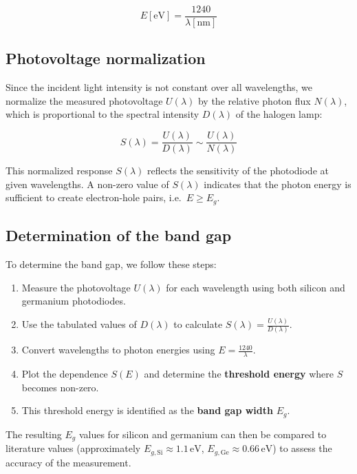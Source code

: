 \documentclass[english,11pt,a4paper]{article}
\begin{document}
\begin{multicols}{2}
		
		\begin{equation}
			E[\mathrm{eV}] = \frac{1240}{\lambda[\mathrm{nm}]}
		\end{equation}
		
		
		\subsection{Photovoltage normalization}
		
		Since the incident light intensity is not constant over all wavelengths, we normalize the measured photovoltage $U(\lambda)$ by the relative photon flux $N(\lambda)$, which is proportional to the spectral intensity $D(\lambda)$ of the halogen lamp:
		
		
		
		\begin{equation}
			S(\lambda) = \frac{U(\lambda)}{D(\lambda)} \sim \frac{U(\lambda)}{N(\lambda)}
		\end{equation}
		
		
		This normalized response $S(\lambda)$ reflects the sensitivity of the photodiode at given wavelengths. A non-zero value of $S(\lambda)$ indicates that the photon energy is sufficient to create electron-hole pairs, i.e.\ $E \geq E_g$.
		
		\subsection{Determination of the band gap}
		
		To determine the band gap, we follow these steps:
		
		\begin{enumerate}
			\item Measure the photovoltage $U(\lambda)$ for each wavelength using both silicon and germanium photodiodes.
			\item Use the tabulated values of $D(\lambda)$ to calculate $S(\lambda) = \frac{U(\lambda)}{D(\lambda)}$.
			\item Convert wavelengths to photon energies using $E = \frac{1240}{\lambda}$.
			\item Plot the dependence $S(E)$ and determine the \textbf{threshold energy} where $S$ becomes non-zero.
			\item This threshold energy is identified as the \textbf{band gap width} $E_g$.
		\end{enumerate}
		
		The resulting $E_g$ values for silicon and germanium can then be compared to literature values\cite{NIST}  (approximately $E_{g,\mathrm{Si}} \approx 1.1 \, \mathrm{eV}$, $E_{g,\mathrm{Ge}}\approx 0.66 \, \mathrm{eV}$) to assess the accuracy of the measurement.
		

\end{multicols}
\end{document}
